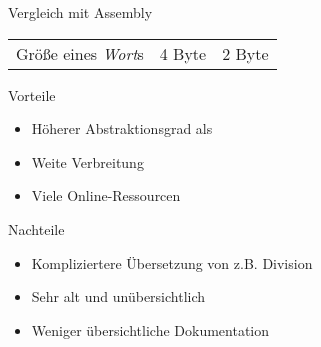 \begin{frame}{Vergleich mit \riscv{} Assembly}
\begin{tabular}{l|l|l}
		Größe eines \emph{Wort}s   & 4 Byte                                                                                                                                                           & 2 Byte                                                                                                                                                                                                                                                                   \\
	\end{tabular}
\end{frame}

\begin{frame}{Vorteile}

	\begin{itemize}
		\item Höherer Abstraktionsgrad als \riscv{}
		\item Weite Verbreitung
		\item Viele Online-Ressourcen
	\end{itemize}
\end{frame}

\begin{frame}{Nachteile}

	\begin{itemize}
		\item Kompliziertere Übersetzung von z.B. Division
		\item Sehr alt und unübersichtlich
		\item Weniger übersichtliche Dokumentation
	\end{itemize}
\end{frame}

